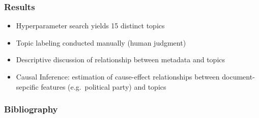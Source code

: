\documentclass[xcolor=dvipsnames]{beamer}
\begin{document}
\begin{frame}
\frametitle{Results}
\begin{itemize}
\item Hyperparameter search yields 15 distinct topics
\item Topic labeling conducted manually (human judgment)
\item Descriptive discussion of relationship between metadata and topics
\item Causal Inference: estimation of cause-effect relationships between document-sepcific features (e.g.\ political party) and topics
\end{itemize}
\end{frame}

\begin{frame}
\frametitle{Bibliography}
\printbibliography
\end{frame}
\end{document}
